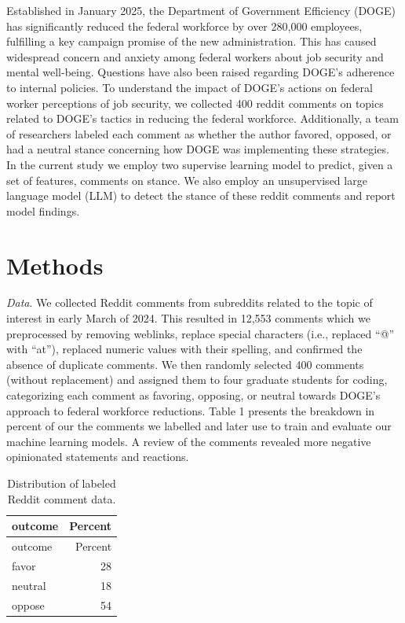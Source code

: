\documentclass[
  12pt]{article}
\begin{document}
Established in January 2025, the Department of Government Efficiency
(DOGE) has significantly reduced the federal workforce by over 280,000
employees, fulfilling a key campaign promise of the new administration.
This has caused widespread concern and anxiety among federal workers
about job security and mental well-being. Questions have also been
raised regarding DOGE's adherence to internal policies. To understand
the impact of DOGE's actions on federal worker perceptions of job
security, we collected 400 reddit comments on topics related to DOGE's
tactics in reducing the federal workforce. Additionally, a team of
researchers labeled each comment as whether the author favored, opposed,
or had a neutral stance concerning how DOGE was implementing these
strategies. In the current study we employ two supervise learning model
to predict, given a set of features, comments on stance. We also employ
an unsupervised large language model (LLM) to detect the stance of these
reddit comments and report model findings.

\section{Methods}\label{sec-meth}

\emph{Data}. We collected Reddit comments from subreddits related to the
topic of interest in early March of 2024. This resulted in 12,553
comments which we preprocessed by removing weblinks, replace special
characters (i.e., replaced ``@'' with ``at''), replaced numeric values
with their spelling, and confirmed the absence of duplicate comments. We
then randomly selected 400 comments (without replacement) and assigned
them to four graduate students for coding, categorizing each comment as
favoring, opposing, or neutral towards DOGE's approach to federal
workforce reductions. Table 1 presents the breakdown in percent of our
the comments we labelled and later use to train and evaluate our machine
learning models. A review of the comments revealed more negative
opinionated statements and reactions.

\begin{longtable}[]{@{}lr@{}}
\caption{Distribution of labeled Reddit comment data.}\tabularnewline
\toprule\noalign{}
outcome & Percent \\
\midrule\noalign{}
\endfirsthead
\toprule\noalign{}
outcome & Percent \\
\midrule\noalign{}
\endhead
\bottomrule\noalign{}
\endlastfoot
favor & 28 \\
neutral & 18 \\
oppose & 54 \\
\end{longtable}
\end{document}
